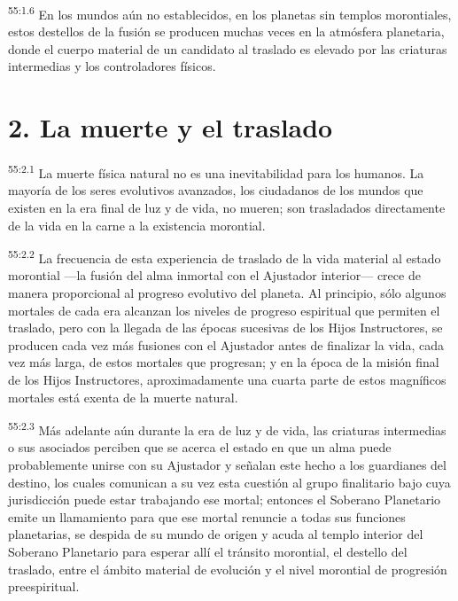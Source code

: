 \par
\textsuperscript{55:1.6} En los mundos aún no establecidos, en los planetas sin templos morontiales, estos destellos de la fusión se producen muchas veces en la atmósfera planetaria, donde el cuerpo material de un candidato al traslado es elevado por las criaturas intermedias y los controladores físicos.

\section*{2. La muerte y el traslado}
\par
\textsuperscript{55:2.1} La muerte física natural no es una inevitabilidad para los humanos. La mayoría de los seres evolutivos avanzados, los ciudadanos de los mundos que existen en la era final de luz y de vida, no mueren; son trasladados directamente de la vida en la carne a la existencia morontial.

\par
\textsuperscript{55:2.2} La frecuencia de esta experiencia de traslado de la vida material al estado morontial ---la fusión del alma inmortal con el Ajustador interior--- crece de manera proporcional al progreso evolutivo del planeta. Al principio, sólo algunos mortales de cada era alcanzan los niveles de progreso espiritual que permiten el traslado, pero con la llegada de las épocas sucesivas de los Hijos Instructores, se producen cada vez más fusiones con el Ajustador antes de finalizar la vida, cada vez más larga, de estos mortales que progresan; y en la época de la misión final de los Hijos Instructores, aproximadamente una cuarta parte de estos magníficos mortales está exenta de la muerte natural.

\par
\textsuperscript{55:2.3} Más adelante aún durante la era de luz y de vida, las criaturas intermedias o sus asociados perciben que se acerca el estado en que un alma puede probablemente unirse con su Ajustador y señalan este hecho a los guardianes del destino, los cuales comunican a su vez esta cuestión al grupo finalitario bajo cuya jurisdicción puede estar trabajando ese mortal; entonces el Soberano Planetario emite un llamamiento para que ese mortal renuncie a todas sus funciones planetarias, se despida de su mundo de origen y acuda al templo interior del Soberano Planetario para esperar allí el tránsito morontial, el destello del traslado, entre el ámbito material de evolución y el nivel morontial de progresión preespiritual.

